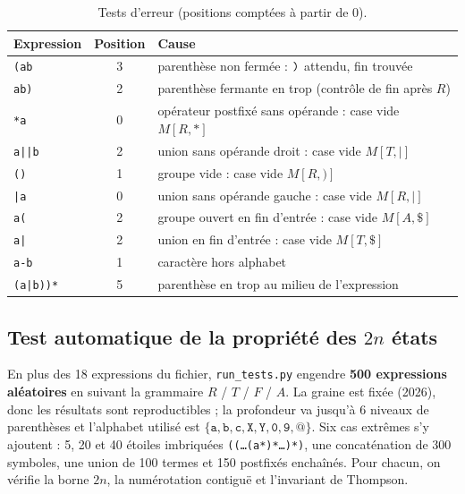 \documentclass[12pt,a4paper]{article}
\newcommand{\code}[1]{{\fontsize{10}{12}\selectfont\texttt{#1}}}
\newcommand{\tok}[1]{\ensuremath{\text{\fontsize{10}{12}\selectfont\ttfamily #1}}}
\begin{document}
\begin{table}[H]
\centering\small
\begin{tabularx}{\linewidth}{l c L}
\toprule
Expression & Position & Cause \\
\midrule
\code{(ab}     & 3 & parenthèse non fermée : \tok{)} attendu, fin trouvée \\
\code{ab)}     & 2 & parenthèse fermante en trop (contrôle de fin après $R$) \\
\code{*a}      & 0 & opérateur postfixé sans opérande : case vide $M[R, \texttt{*}]$ \\
\code{a||b}    & 2 & union sans opérande droit : case vide $M[T, \texttt{|}]$ \\
\code{()}      & 1 & groupe vide : case vide $M[R, \texttt{)}]$ \\
\code{|a}      & 0 & union sans opérande gauche : case vide $M[R, \texttt{|}]$ \\
\code{a(}      & 2 & groupe ouvert en fin d'entrée : case vide $M[A, \texttt{\$}]$ \\
\code{a|}      & 2 & union en fin d'entrée : case vide $M[T, \texttt{\$}]$ \\
\code{a-b}     & 1 & caractère hors alphabet \\
\code{(a|b))*} & 5 & parenthèse en trop au milieu de l'expression \\
\bottomrule
\end{tabularx}
\caption{Tests d'erreur (positions comptées à partir de 0).}
\end{table}

\subsection{Test automatique de la propriété des \texorpdfstring{$2n$}{2n} états}

En plus des 18 expressions du fichier, \code{run\_tests.py} engendre \textbf{500 expressions
aléatoires} en suivant la grammaire $R$ / $T$ / $F$ / $A$. La graine est fixée (2026), donc les
résultats sont reproductibles ; la profondeur va jusqu'à 6 niveaux de parenthèses et
l'alphabet utilisé est $\{\texttt{a}, \texttt{b}, \texttt{c}, \texttt{X}, \texttt{Y},
\texttt{0}, \texttt{9}, \texttt{@}\}$. Six cas extrêmes s'y ajoutent : 5, 20 et 40 étoiles
imbriquées \code{((\dots(a*)*\dots)*)}, une concaténation de 300 symboles, une union de 100
termes et 150 postfixés enchaînés. Pour chacun, on vérifie la borne $2n$, la numérotation
contiguë et l'invariant de Thompson.
\end{document}

